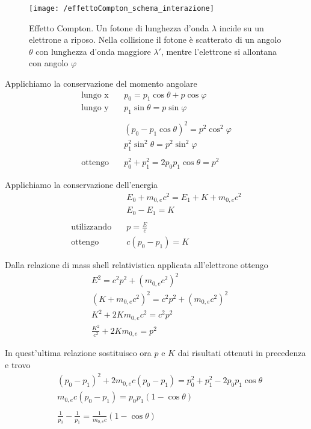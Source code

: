 \begin{figure}[h]
\centering
\texttt{[image: /effettoCompton\_schema\_interazione]}
\caption{ Effetto Compton. Un fotone di lunghezza d'onda $\lambda$ incide su un elettrone a riposo. 
Nella collisione il fotone è scatterato di un angolo $\theta$ con lunghezza d'onda maggiore $\lambda '$, 
mentre l'elettrone si allontana con angolo $\varphi$ }
\end{figure}

Applichiamo la conservazione del momento angolare
\begin{equation}
\begin{split}
\mbox{lungo x} \quad & p_0 = p_1 \cos\theta + p \cos\varphi \\
\mbox{lungo y} \quad & p_1 \sin\theta = p \sin\varphi \\ \\
& (p_0 - p_1 \cos\theta)^2 = p^2 \cos^2\varphi \\
& p_1^2 \sin^2\theta = p^2 \sin^2\varphi \\ \\
\mbox{ottengo} \quad & p_0^2 + p_1^2 = 2 p_0 p_1 \cos\theta = p^2
\end{split}
\end{equation}

Applichiamo la conservazione dell'energia
\begin{equation}
\begin{split}
& E_0 + m_{0,e} c^2 = E_1 + K + m_{0,e} c^2 \\
& E_0 - E_1 = K \\ \\
\mbox{utilizzando} \quad & p =\frac{ E}{c } \\
\mbox{ottengo} \quad & c (p_0 - p_1) = K 
\end{split}
\end{equation}

Dalla relazione di mass shell relativistica applicata all'elettrone ottengo
\begin{equation}
\begin{split}
& E^2 = c^2 p^2 + (m_{0,e} c^2)^2 \\
& (K + m_{0,e} c^2)^2 = c^2 p^2 + (m_{0,e} c^2)^2 \\
& K^2 + 2 K m_{0,e} c^2 = c^2 p^2 \\
& \frac{ K^2}{c^2 } + 2Km_{0,e} = p^2
\end{split}
\end{equation}

In quest'ultima relazione sostituisco ora $p$ e $K$ dai risultati ottenuti in precedenza e trovo
\begin{equation}
\begin{split}
& (p_0 - p_1)^2 + 2m_{0,e} c (p_0 - p_1) = p_0^2 + p_1^2 - 2p_0 p_1 \cos\theta \\
& m_{0,e} c (p_0 - p_1) = p_0 p_1 (1 - \cos\theta) \\ \\
& \frac{ 1}{p_0 } - \frac{ 1}{p_1 } = \frac{ 1}{m_{0,e} c } (1 - \cos\theta)
\end{split}
\end{equation}

